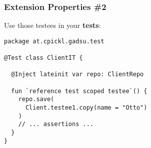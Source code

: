 \begin{frame}[fragile] \frametitle{Extension Properties \#2}
Use those testees in your \textbf{tests}:
\begin{lstlisting}
package at.cpickl.gadsu.test

@Test class ClientIT {

  @Inject lateinit var repo: ClientRepo
  
  fun `reference test scoped testee`() {
    repo.save(
      Client.testee1.copy(name = "Otto")
    )
    // ... assertions ... 
  }
}
\end{lstlisting}
\end{frame}





